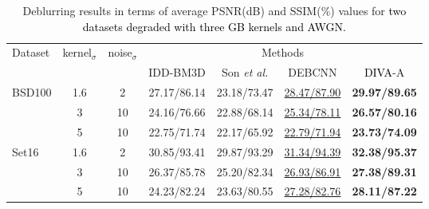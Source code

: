 \documentclass[10pt,journal,compsoc]{IEEEtran}
\newcommand\bdr[1]{{\textbf{#1}}}
\newcommand\bdb[1]{{\underline{#1}}}
\newcommand{\sd}{\textcolor{black}}
\newcommand{\dk}{\textcolor{black}}
\begin{document}








\begin{table}[t!]
\setlength\tabcolsep{1.5pt}

\begin{scriptsize}

\begin{center}
\caption{Deblurring results in terms of average PSNR(dB) and SSIM(\%) values for \sd{two datasets degraded with three GB kernels and AWGN.}}
\label{tab:tab_psnr_ssim_gaussian_deblur}
\begin{tabular}{lcc cccc}
\hline

Dataset & kernel$_{\sigma}$ & noise$_{\sigma}$ & \multicolumn{4}{c}{Methods}\\ 

& & & IDD-BM3D\cite{Danielyan2012bm3d} & Son \textit{et al.}\cite{Son2017fast} & DEBCNN\cite{Wang2018training} & \dk{DIVA}-A \\
\hline


\multirow{3}{*}{BSD100}

& 1.6 & 2  & 27.17/86.14 & 23.18/73.47 & \bdb{28.47/87.90} & \bdr{29.97/89.65} \\

&  3  & 10 & 24.16/76.66 & 22.88/68.14 &\bdb{ 25.34/78.11} & \bdr{26.57/80.16} \\

&  5  & 10 & 22.75/71.74 & 22.17/65.92 & \bdb{22.79/71.94} & \bdr{23.73/74.09} \\

\hline


\multirow{3}{*}{Set16}

& 1.6 & 2  & 30.85/93.41 & 29.87/93.29 & \bdb{31.34/94.39} & \bdr{32.38/95.37} \\

&  3  & 10 & 26.37/85.78 & 25.20/82.34 & \bdb{26.93/86.91} & \bdr{27.38/89.31} \\

&  5  & 10 & 24.23/82.24 & 23.63/80.55 & \bdb{27.28/82.76} & \bdr{28.11/87.22} \\

\hline


\end{tabular}\end{center}
\end{scriptsize}
\end{table}
\end{document}
